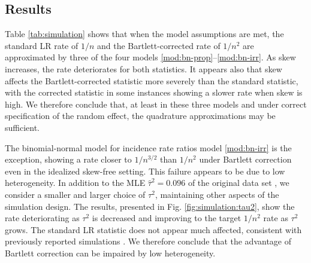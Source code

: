\documentclass[12pt]{article}
\newcommand{\n}{n}
\begin{document}
\subsection{Results}

Table \ref{tab:simulation} shows that when the model assumptions are
met, the standard LR rate of $1/\n$ and the Bartlett-corrected rate of
$1/\n^2$ are approximated by three of the four models \eqref{mod:bn-prop}--\eqref{mod:bn-irr}. As
skew increases, the rate deteriorates for both
statistics. It appears also that skew affects the Bartlett-corrected statistic more severely than the standard statistic, with the corrected statistic in some instances showing a slower rate when skew is high. We therefore conclude that, at least in these three
models and under correct specification of the random effect, the quadrature approximations may be sufficient.%

The binomial-normal model for incidence rate ratios model
\eqref{mod:bn-irr} is the exception, showing a rate closer to
$1/\n^{3/2}$ than $1/\n^2$ under Bartlett correction even in the
idealized skew-free setting. This failure appears to be due to low
heterogeneity. In addition to  the MLE
$\hat\tau^2=0.096$ of the original data set \citep{niel:08}, we consider a smaller and larger choice of
$\tau^2$, maintaining other aspects of the simulation design. The
results, presented in Fig. \ref{fig:simulation:tau2}, show the rate
deteriorating as $\tau^2 $ is decreased and improving to the target $1/\n^2$ rate as
$\tau^2$ grows. The standard LR statistic does not appear much affected,
consistent with previously reported simulations
\citep{jackson:18,bakbergenuly:18}. We therefore conclude that the
advantage of Bartlett correction can be impaired by low heterogeneity.

\begin{table}[htbp]\centering

\caption{Simulation results. The cells contain the observed medians and SDs of the log of the rate of convergence of the empirical Kolmogorov-Smirnov distance to a chi-squared distribution.}
\label{tab:simulation}
\end{table}


\begin{table}[htbp]\centering

\end{table}

\begin{table}[htbp]\centering

\end{table}
\end{document}
